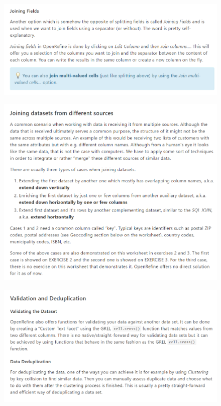 \begin{figure}[H]
    \includegraphics[width=\linewidth]{./Figures/Appendices/worksheet/18.png}
\end{figure}
\begin{figure}[H]
    \includegraphics[width=\linewidth]{./Figures/Appendices/worksheet/19.png}
\end{figure}
\begin{figure}[H]
    \includegraphics[width=\linewidth]{./Figures/Appendices/worksheet/20.png}
\end{figure}
